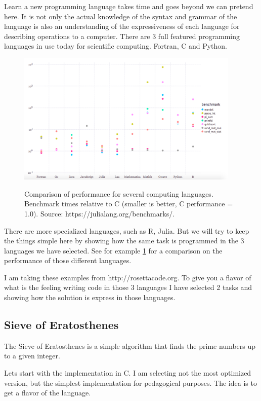 Learn a new programming language takes time and goes beyond we can pretend here. It is not only the actual knowledge of the syntax and grammar of the language is also an understanding of the expressiveness of each language for describing operations to a computer. There are 3 full featured programming languages in use today for scientific computing. Fortran, C and Python. 

\begin{figure}
\includegraphics[width=0.95\textwidth]{images/julia_benchmark.png}
\label{bench}
\caption{Comparison of performance for several computing languages. Benchmark times relative to C (smaller is better, C performance = 1.0). Source: https://julialang.org/benchmarks/.}
\end{figure}


There are more specialized languages, such as R, Julia. But we will try to keep the things simple here by showing how the same task is programmed in the 3 languages we have selected.
See for example \ref{bench} for a comparison on the performance of those different languages.

I am taking these examples from http://rosettacode.org.
To give you a flavor of what is the feeling writing code in those 3 languages I have selected 2 tasks and showing how the solution is express in those languages.

\subsection{Sieve of Eratosthenes}

The Sieve of Eratosthenes is a simple algorithm that finds the prime numbers up to a given integer.

Lets start with the implementation in C. I am selecting not the most optimized version, but the simplest implementation for pedagogical purposes. The idea is to get a flavor of the language.

